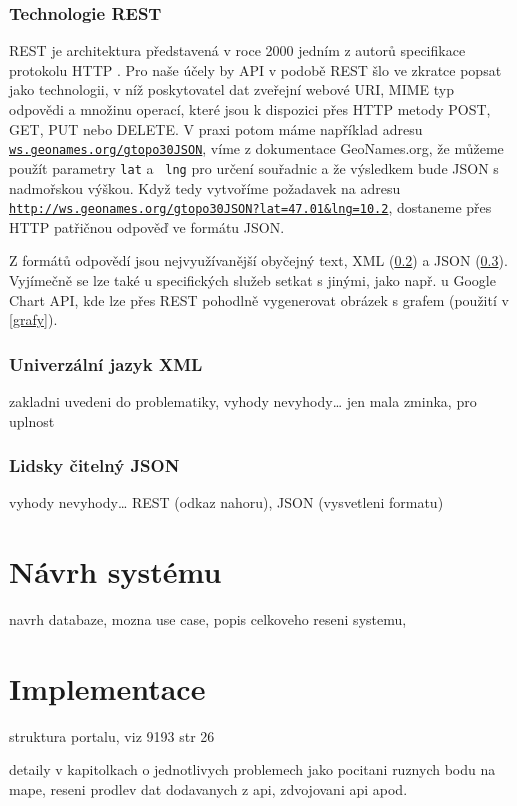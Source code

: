 \subsection{Technologie REST}\label{rest}
REST je architektura představená v roce 2000 jedním z autorů
specifikace protokolu HTTP \cite{rest}. Pro naše účely by API v
podobě REST šlo ve zkratce popsat jako technologii, v níž poskytovatel dat zveřejní webové URI, MIME typ odpovědi a množinu operací, které jsou k dispozici přes HTTP metody POST, GET, PUT nebo DELETE. V praxi
potom máme například adresu {\tt \url{ws.geonames.org/gtopo30JSON}},
víme z dokumentace GeoNames.org, že můžeme použít parametry {\tt lat} a {\tt
lng} pro určení souřadnic a že výsledkem bude JSON s nadmořskou
výškou. Když tedy vytvoříme požadavek na adresu
{\tt \url{http://ws.geonames.org/gtopo30JSON?lat=47.01&lng=10.2}},
dostaneme přes HTTP patřičnou odpověď ve formátu JSON.

Z formátů odpovědí jsou nej\-využívanější obyčejný text, XML (\ref{xml})
a JSON (\ref{json}). Vyjímečně se lze také u specifických služeb
setkat s jinými, jako např. u Google Chart API, kde lze přes REST
pohodlně vygenerovat obrázek s grafem (použití v \ref{grafy}).

\subsection{Univerzální jazyk XML}\label{xml}
zakladni uvedeni do problematiky, vyhody nevyhody\ldots
jen mala zminka, pro uplnost
\subsection{Lidsky čitelný JSON}\label{json}
vyhody nevyhody\ldots
REST (odkaz nahoru), JSON (vysvetleni formatu)

\chapter{Návrh systému}
navrh databaze, mozna use case, popis celkoveho reseni systemu,

\chapter{Implementace}
struktura portalu, viz 9193 str 26

detaily v kapitolkach o jednotlivych problemech jako pocitani ruznych bodu na mape, reseni prodlev dat
dodavanych z api, zdvojovani api apod.


